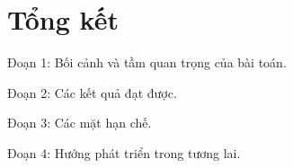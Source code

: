 \clearpage
{}

\chapter*{Tổng kết}

Đoạn 1: Bối cảnh và tầm quan trọng của bài toán.

\vspace{0.3cm}

Đoạn 2: Các kết quả đạt được.

\vspace{0.3cm}

Đoạn 3: Các mặt hạn chế.

\vspace{0.3cm}

Đoạn 4: Hướng phát triển trong tương lai.
